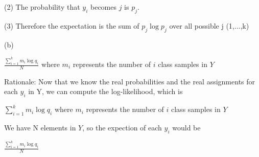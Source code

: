 \documentclass[11pt]{article}
\theoremstyle{definition}
\begin{document}
(2) The probability that $y_i$ becomes $j$ is $p_j$.

(3) Therefore the expectation is the sum of $p_j \log p_j$ over all possible j (1,...,k)

\bigskip
(b)

$ \frac{\sum_{i=1}^{k} m_i \log q_i}{N} $ where $m_i$ represents the number of $i$ class samples in $Y$

\bigskip

Rationale: Now that we know the real probabilities and the real assignments for each $y_i$ in Y, we can compute the log-likelihood, which is

$ \sum_{i=1}^{k} m_i \log q_i $ where $m_i$ represents the number of $i$ class samples in $Y$

We have N elements in $Y$, so the expection of each $y_i$ would be 

$ \frac{\sum_{i=1}^{k} m_i \log q_i}{N} $
\end{document}
